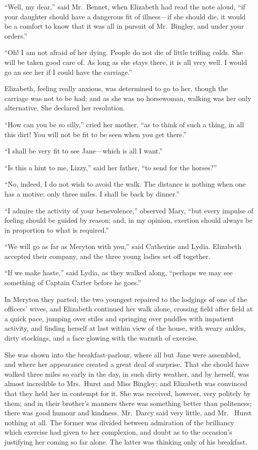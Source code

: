 ``Well, my dear,'' said Mr.\ Bennet, when Elizabeth had read the
note aloud, ``if your daughter should have a dangerous fit of
illness---if she should die, it would be a comfort to know that it
was all in pursuit of Mr.\ Bingley, and under your orders.''

``Oh! I am not afraid of her dying.  People do not die of little
trifling colds.  She will be taken good care of.  As long as she
stays there, it is all very well.  I would go an see her if I could
have the carriage.''

Elizabeth, feeling really anxious, was determined to go to her,
though the carriage was not to be had; and as she was no
horsewoman, walking was her only alternative.  She declared her
resolution.

``How can you be so silly,'' cried her mother, ``as to think of such
a thing, in all this dirt!  You will not be fit to be seen when you
get there.''

``I shall be very fit to see Jane---which is all I want.''

``Is this a hint to me, Lizzy,'' said her father, ``to send for
the horses?''

``No, indeed, I do not wish to avoid the walk.  The distance is
nothing when one has a motive; only three miles.  I shall be back
by dinner.''

``I admire the activity of your benevolence,'' observed Mary, ``but
every impulse of feeling should be guided by reason; and, in my
opinion, exertion should always be in proportion to what is
required.''

``We will go as far as Meryton with you,'' said Catherine and
Lydia.  Elizabeth accepted their company, and the three young
ladies set off together.

``If we make haste,'' said Lydia, as they walked along, ``perhaps
we may see something of Captain Carter before he goes.''

In Meryton they parted; the two youngest repaired to the lodgings of
one of the officers' wives, and Elizabeth continued her walk alone,
crossing field after field at a quick pace, jumping over stiles
and springing over puddles with impatient activity, and finding
herself at last within view of the house, with weary ankles, dirty
stockings, and a face glowing with the warmth of exercise.

She was shown into the breakfast-parlour, where all but Jane
were assembled, and where her appearance created a great deal
of surprise.  That she should have walked three miles so early
in the day, in such dirty weather, and by herself, was almost
incredible to Mrs.\ Hurst and Miss Bingley; and Elizabeth was
convinced that they held her in contempt for it.  She was
received, however, very politely by them; and in their brother's
manners there was something better than politeness; there was
good humour and kindness.  Mr.\ Darcy said very little, and Mr.\ %
Hurst nothing at all.  The former was divided between admiration
of the brilliancy which exercise had given to her complexion,
and doubt as to the occasion's justifying her coming so far
alone.  The latter was thinking only of his breakfast.

